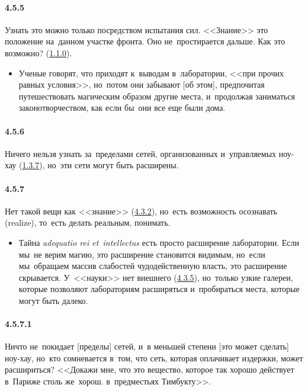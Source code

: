 \paragraph{4.5.5}\hypertarget{par:4.5.5}{} Узнать это можно только посредством испытания сил. <<Знание>> это положение на~данном участке фронта. Оно не~простирается дальше. Как это возможно? (\hyperlink{par:1.1.0}{1.1.0}).
	\begin{itemize}
	\item 
	Ученые говорят, что приходят к~выводам в~лаборатории, <<при прочих равных условия>>, но~потом они забывают [об этом], предпочитая путешествовать магическим образом другие места, и~продолжая заниматься законотворчеством, как если бы~они все еще были дома.
	\end{itemize}	


\paragraph{4.5.6}\hypertarget{par:4.5.6}{} Ничего нельзя узнать за~пределами сетей, организованных и~управляемых ноу-хау (\hyperlink{par:1.3.7}{1.3.7}), но~эти сети могут быть расширены.


\paragraph{4.5.7}\hypertarget{par:4.5.7}{} Нет такой вещи как <<знание>> (\hyperlink{par:4.3.2}{4.3.2}), но~есть возможность осознавать (realize), то~есть делать реальным, понимать. 
	\begin{itemize}
	\item 
	Тайна {\itshape adequatio rei et~intellectus} есть просто расширение лаборатории. Если мы~не верим магию, это расширение становится видимым, но~если мы~обращаем массив слабостей чудодейственную власть, это расширение скрывается. У~<<науки>> нет внешнего (\hyperlink{par:4.3.5}{4.3.5}), но~только узкие галереи, которые позволяют лабораториям расширяться и~пробираться места, которые могут быть далеко. 
	\end{itemize}	

\paragraph{4.5.7.1}\hypertarget{par:4.5.7.1}{} Ничто не~покидает [пределы] сетей, и~в меньшей степени [это может сделать] ноу-хау, но~кто сомневается в~том, что сеть, которая оплачивает издержки, может расшириться? <<Докажи мне, что это вещество, которое так хорошо действует в~Париже столь же~хорош. в~предместьях Тимбукту>>.

